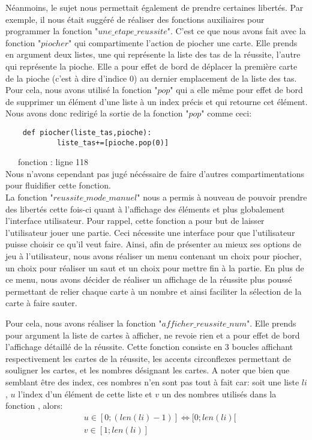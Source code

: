 \documentclass[10pt,a4paper,french,titlepage]{article}
\begin{document}
Néanmoins, le sujet nous permettait également de prendre certaines libertés. Par exemple, il nous était suggéré de réaliser des fonctions
auxiliaires pour programmer la fonction "$une\_etape\_reussite$". C'est ce que nous avons fait avec la fonction "$piocher$" qui compartimente l'action de 
piocher une carte. Elle prends en argument deux listes, une qui représente la liste des tas de la réussite, l'autre qui représente la pioche. Elle a 
pour effet de bord de déplacer la première carte de la pioche (c'est à dire d'indice 0) au dernier emplacement de la liste des tas. Pour cela, nous 
avons utilisé la fonction "$pop$" qui a elle même pour effet de bord de supprimer un élément d'une liste à un index précis et qui retourne cet élément.
Nous avons donc redirigé la sortie de la fonction "$pop$" comme ceci:\\
\begin{lstlisting}
	def piocher(liste_tas,pioche):
    		liste_tas+=[pioche.pop(0)]

\end{lstlisting}

~~~fonction : ligne 118\\



Nous n'avons cependant pas jugé nécéssaire de faire d'autres compartimentations pour fluidifier cette fonction.\\

La fonction "$reussite\_mode\_manuel$" nous a permis à nouveau de pouvoir prendre des libertés cette fois-ci quant à l'affichage des éléments et
plus globalement l'interface utilisateur. Pour rappel, cette fonction a pour but de laisser l'utilisateur jouer une partie. Ceci nécessite une interface
pour que l'utilisateur puisse choisir ce qu'il veut faire. Ainsi, afin de présenter au mieux ses options de jeu à l'utilisateur, nous avons réaliser un
menu contenant un choix pour piocher, un choix pour réaliser un saut et un choix pour mettre fin à la partie. En plus de ce menu, nous avons décider de
réaliser un affichage de la réussite plus poussé permettant de relier chaque carte à un nombre et ainsi faciliter la sélection de la carte à faire
sauter. 

Pour cela, nous avons réaliser la fonction "$afficher\_reussite\_num$". Elle prends pour argument la liste de cartes à afficher, ne revoie rien et a pour effet de bord l'affichage détaillé de la réussite. Cette fonction consiste en 3 boucles affichant respectivement les cartes de la réussite, les
accents circonflexes permettant de souligner les cartes, et les nombres désignant les cartes. A noter que bien que semblant être des index, ces nombres
n'en sont pas tout à fait car: soit une liste $li$, $u$ l'index d'un élément de cette liste et $v$ un des nombres utilisés dans la fonction , alors:
\begin{align*}
	&u \in [0;(len(li)-1)] \iff [0;len(li)[\\
	&v \in [1;len(li)]
\end{align*}
\end{document}
